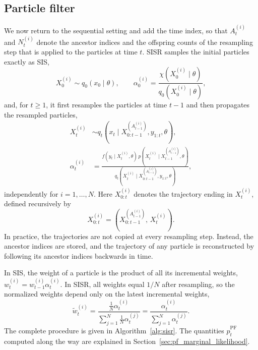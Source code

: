 \subsection{Particle filter}
\label{sec:particle_filter}
We now return to the sequential setting and add the time index, so that $A_t^{(i)}$ and $N_t^{(i)}$ denote the ancestor indices and the offspring counts of the resampling step that is applied to the particles at time $t$. SISR samples the initial particles exactly as SIS,
\begin{equation}
    X_0^{(i)} \sim q_0(x_0\mid\theta), \qquad \alpha_0^{(i)} = \frac{\chi(X_0^{(i)}\mid\theta)}{q_0(X_0^{(i)}\mid\theta)},
\end{equation}
and, for $t\ge 1$, it first resamples the particles at time $t-1$ and then propagates the resampled particles,
\begin{equation}
    \begin{aligned}
        X_t^{(i)} &\sim q_t\left(x_t\mid X_{0:t-1}^{(A_{t-1}^{(i)})},y_{1:t},\theta\right), \\
        \alpha_t^{(i)} &= \frac{f(y_t\mid X_t^{(i)},\theta)\,p\left(X_t^{(i)}\mid X_{t-1}^{(A_{t-1}^{(i)})},\theta\right)}{q_t\left(X_t^{(i)}\mid X_{0:t-1}^{(A_{t-1}^{(i)})},y_{1:t},\theta\right)},
    \end{aligned}
    \label{eq:sisr_propagation}
\end{equation}
independently for $i=1,\ldots,N$. Here $X_{0:t}^{(i)}$ denotes the trajectory ending in $X_t^{(i)}$, defined recursively by
\begin{equation}
    X_{0:t}^{(i)} = \left(X_{0:t-1}^{(A_{t-1}^{(i)})},\, X_t^{(i)}\right).
    \label{eq:sisr_trajectory}
\end{equation}
In practice, the trajectories are not copied at every resampling step. Instead, the ancestor indices are stored, and the trajectory of any particle is reconstructed by following its ancestor indices backwards in time.

In SIS, the weight of a particle is the product of all its incremental weights, $w_t^{(i)} = w_{t-1}^{(i)}\alpha_t^{(i)}$. In SISR, all weights equal $1/N$ after resampling, so the normalized weights depend only on the latest incremental weights,
\begin{equation}
    \tilde{w}_t^{(i)} = \frac{\frac{1}{N}\alpha_t^{(i)}}{\sum_{j=1}^{N}\frac{1}{N}\alpha_t^{(j)}} = \frac{\alpha_t^{(i)}}{\sum_{j=1}^{N}\alpha_t^{(j)}}.
    \label{eq:sisr_normalized_weights}
\end{equation}
The complete procedure is given in Algorithm~\ref{alg:sisr}. The quantities $\hat{p}^{\mathrm{PF}}_t$ computed along the way are explained in Section~\ref{sec:pf_marginal_likelihood}.

